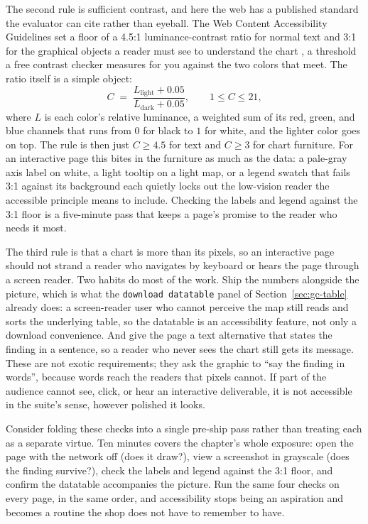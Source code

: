 \documentclass[
    a4paper,
    fontsize=10pt,
    twoside=true,
    numbers=noenddot,
]{kaobook}
\begin{document}
The second rule is sufficient contrast, and here the web has a published standard the evaluator can cite rather than eyeball. The Web Content Accessibility Guidelines set a floor of a 4.5:1 luminance-contrast ratio for normal text and 3:1 for the graphical objects a reader must see to understand the chart \parencite{w3c2018wcag}, a threshold a free contrast checker measures for you against the two colors that meet. The ratio itself is a simple object:
\[
  C \;=\; \frac{L_{\text{light}} + 0.05}{L_{\text{dark}} + 0.05},
  \qquad 1 \le C \le 21,
\]
where $L$ is each color's relative luminance, a weighted sum of its red, green, and blue channels that runs from $0$ for black to $1$ for white, and the lighter color goes on top. The rule is then just $C \ge 4.5$ for text and $C \ge 3$ for chart furniture. For an interactive page this bites in the furniture as much as the data: a pale-gray axis label on white, a light tooltip on a light map, or a legend swatch that fails 3:1 against its background each quietly locks out the low-vision reader the accessible principle means to include. Checking the labels and legend against the 3:1 floor is a five-minute pass that keeps a page's promise to the reader who needs it most.

The third rule is that a chart is more than its pixels, so an interactive page should not strand a reader who navigates by keyboard or hears the page through a screen reader. Two habits do most of the work. Ship the numbers alongside the picture, which is what the \texttt{download datatable} panel of Section~\ref{sec:gc-table} already does: a screen-reader user who cannot perceive the map still reads and sorts the underlying table, so the datatable is an accessibility feature, not only a download convenience. And give the page a text alternative that states the finding in a sentence, so a reader who never sees the chart still gets its message. These are not exotic requirements; they ask the graphic to \enquote{say the finding in words}, because words reach the readers that pixels cannot. If part of the audience cannot see, click, or hear an interactive deliverable, it is not accessible in the suite's sense, however polished it looks.

Consider folding these checks into a single pre-ship pass rather than treating each as a separate virtue. Ten minutes covers the chapter's whole exposure: open the page with the network off (does it draw?), view a screenshot in grayscale (does the finding survive?), check the labels and legend against the 3:1 floor, and confirm the datatable accompanies the picture. Run the same four checks on every page, in the same order, and accessibility stops being an aspiration and becomes a routine the shop does not have to remember to have.
\end{document}
